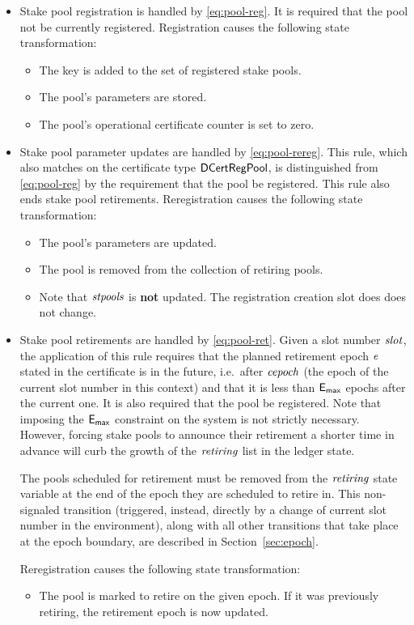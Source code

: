 \begin{itemize}
  \item Stake pool registration is handled by \cref{eq:pool-reg}.
    It is required that the pool not be currently registered.
    Registration causes the following state transformation:
    \begin{itemize}
      \item The key is added to the set of registered stake pools.
      \item The pool's parameters are stored.
      \item The pool's operational certificate counter is set to zero.
    \end{itemize}
  \item Stake pool parameter updates are handled by \cref{eq:pool-rereg}.
    This rule, which also matches on the certificate type $\mathsf{DCertRegPool}$,
    is distinguished from \cref{eq:pool-reg} by the requirement that
    the pool be registered. This rule also ends stake pool retirements.
    Reregistration causes the following state transformation:
    \begin{itemize}
      \item The pool's parameters are updated.
      \item The pool is removed from the collection of retiring pools.
      \item Note that $\mathit{stpools}$ is \textbf{not} updated.
        The registration creation slot does does not change.
    \end{itemize}
  \item Stake pool retirements are handled by \cref{eq:pool-ret}.
    Given a slot number $\mathit{slot}$, the application of this rule requires that the
    planned retirement epoch $\mathit{e}$ stated in the certificate is in the future,
    i.e.~after $\mathit{cepoch}$ (the epoch of the current slot number in this context) and
    that it is less than $\mathsf{E_{max}}$ epochs after the current one.
    It is also required that the pool be registered.
    Note that imposing the $\mathsf{E_{max}}$ constraint on the system is not strictly necessary.
    However, forcing stake pools to announce their retirement a shorter time in
    advance will curb the growth of the $\mathit{retiring}$ list in the ledger state.

    The pools scheduled for retirement must be removed from
    the $\mathit{retiring}$ state variable at the end of the epoch they are scheduled
    to retire in. This non-signaled transition (triggered, instead, directly by a
    change of current slot number in the environment), along with all other transitions
    that take place at the epoch boundary, are described in Section~\ref{sec:epoch}.

    Reregistration causes the following state transformation:
    \begin{itemize}
      \item The pool is marked to retire on the given epoch.
        If it was previously retiring, the retirement epoch is now updated.
    \end{itemize}
\end{itemize}

